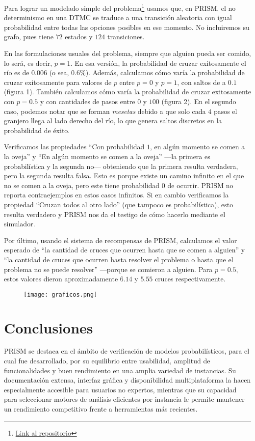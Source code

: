 \documentclass[runningheads]{llncs}
\begin{document}
Para lograr un modelado simple del problema\footnote[1]{\href{https://github.com/JulietaStorino/Software-Engineering-II-FAMAF/blob/main/caso_estudio/crossing.pm}{Link al repositorio}} usamos que, en PRISM, el no determinismo en una DTMC se traduce a una transición aleatoria con igual probabilidad entre todas las opciones posibles en ese momento. No incluiremos su grafo, pues tiene $72$ estados y $124$ transiciones.

En las formulaciones usuales del problema, siempre que alguien pueda ser comido, lo será, es decir, $p=1$. En esa versión, la probabilidad de cruzar exitosamente el río es de $0.006$ (o sea, $0.6\%$). Además, calculamos cómo varía la probabilidad de cruzar exitosamente para valores de $p$ entre $p=0$ y $p=1$, con saltos de a $0.1$ (figura 1). También calculamos cómo varía la probabilidad de cruzar exitosamente con $p=0.5$ y con cantidades de pasos entre $0$ y $100$ (figura 2). En el segundo caso, podemos notar que se forman \textit{mesetas} debido a que solo cada $4$ pasos el granjero llega al lado derecho del río, lo que genera saltos discretos en la probabilidad de éxito.

Verificamos las propiedades ``Con probabilidad $1$, en algún momento se comen a la oveja'' y ``En algún momento se comen a la oveja'' —la primera es probabilística y la segunda no— obteniendo que la primera resulta verdadera, pero la segunda resulta falsa. Esto es porque existe un camino infinito en el que no se comen a la oveja, pero este tiene probabilidad $0$ de ocurrir. PRISM no reporta contraejemplos en estos casos infinitos. Si en cambio verificamos la propiedad ``Cruzan todos al otro lado'' (que tampoco es probabilística), esto resulta verdadero y PRISM nos da el testigo de cómo hacerlo mediante el simulador.

Por último, usando el sistema de recompensas de PRISM, calculamos el valor esperado de ``la cantidad de cruces que ocurren hasta que se comen a alguien'' y ``la cantidad de cruces que ocurren hasta resolver el problema o hasta que el problema no se puede resolver'' —porque se comieron a alguien. Para $p=0.5$, estos valores dieron aproximadamente $6.14$ y $5.55$ cruces respectivamente.

\begin{figure}
  \centering
  \texttt{[image: graficos.png]}
\end{figure}

\section{Conclusiones}
PRISM se destaca en el ámbito de verificación de modelos probabilísticos, para el cual fue desarrollado, por su equilibrio entre usabilidad, amplitud de funcionalidades y buen rendimiento en una amplia variedad de instancias. Su documentación extensa, interfaz gráfica y disponibilidad multiplataforma la hacen especialmente accesible para usuarios no expertos, mientras que su capacidad para seleccionar motores de análisis eficientes por instancia le permite mantener un rendimiento competitivo frente a herramientas más recientes.
\end{document}
